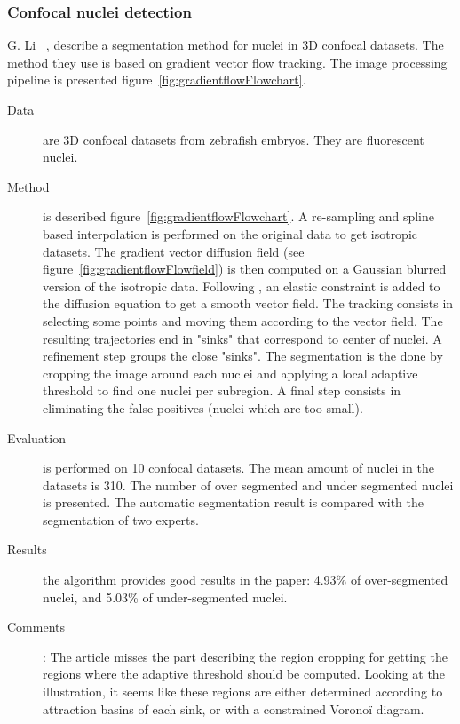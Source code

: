 \subsubsection*{Confocal nuclei detection}
G. Li {\etal}~\cite{li20073}, describe a segmentation method for nuclei in 3D confocal datasets. The method they use is based on gradient vector flow tracking.
The image processing pipeline is presented figure~\ref{fig:gradientflowFlowchart}.
\begin{description}
  \item[Data] are 3D confocal datasets from zebrafish embryos. They are fluorescent nuclei.
  \item[Method] is described figure~\ref{fig:gradientflowFlowchart}. 
  A re-sampling and spline based interpolation is performed on the original data to get isotropic datasets.
  The gradient vector diffusion field (see figure~\ref{fig:gradientflowFlowfield}) is then computed on a Gaussian blurred version of the isotropic data.
  Following \cite{bajcsy1989multiresolution}, an elastic constraint is added to the diffusion equation to get a smooth vector field.
  The tracking consists in selecting some points and moving them according to the vector field. The resulting trajectories end in "sinks" that correspond to center of nuclei.
  A refinement step groups the close "sinks".
  The segmentation is the done by cropping the image around each nuclei and applying a local adaptive threshold to find one nuclei per subregion.
  A final step consists in eliminating the false positives (nuclei which are too small).
  \item[Evaluation] is performed on 10 confocal datasets. The mean amount of nuclei in the datasets is 310. The number of over segmented and under segmented nuclei is presented. The automatic segmentation result is compared with the segmentation of two experts.
  \item[Results] the algorithm provides good results in the paper: 
  4.93\% of over-segmented nuclei,
  and 5.03\% of under-segmented nuclei.
  \item[Comments]:
  The article misses the part describing the region cropping for getting the regions where the adaptive
   threshold should be computed.
   Looking at the illustration, it seems like these regions are either determined
   according to attraction basins of each sink, or with a constrained Voronoï diagram.
\end{description}
